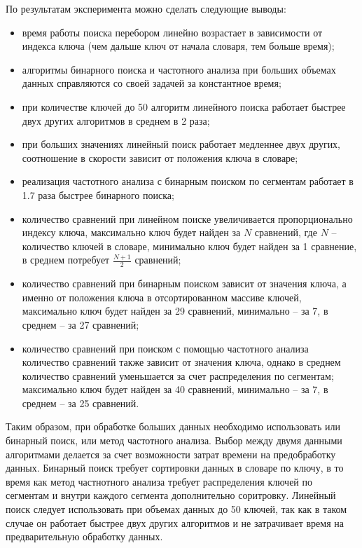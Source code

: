 По результатам эксперимента можно сделать следующие выводы:
\begin{itemize}[]
    \item время работы поиска перебором линейно возрастает в зависимости от
        индекса ключа (чем дальше ключ от начала словаря, тем больше время);
    \item алгоритмы бинарного поиска и частотного анализа при больших объемах
        данных справляются со своей задачей за константное время;
    \item при количестве ключей до 50 алгоритм линейного поиска работает
        быстрее двух других алгоритмов в среднем в 2 раза;
    \item при больших значениях линейный поиск работает медленнее двух других,
        соотношение в скорости зависит от положения ключа в словаре;
   \item реализация частотного анализа с бинарным поиском по сегментам работает
       в 1.7 раза быстрее бинарного поиска;
   \item количество сравнений при линейном поиске увеличивается пропорционально
        индексу ключа, максимально ключ будет найден за $N$ сравнений, где $N$
        -- количество ключей в словаре, минимально ключ будет найден за 1
        сравнение, в среднем потребует $\frac{N + 1}{2}$ сравнений;
   \item количество сравнений при бинарным поиском зависит от значения ключа, а
        именно от положения ключа в отсортированном массиве ключей, максимально
        ключ будет найден за 29 сравнений, минимально -- за 7, в среднем -- за
        27 сравнений;
   \item количество сравнений при поиском с помощью частотного анализа
       количество сравнений также зависит от значения ключа, однако в среднем
        количество сравнений уменьшается за счет распределения по сегментам;
        максимально ключ будет найден за 40 сравнений, минимально -- за 7, в
        среднем -- за 25 сравнений.
\end{itemize}

Таким образом, при обработке больших данных необходимо использовать или
бинарный поиск, или метод частотного анализа. Выбор между двумя данными
алгоритмами делается за счет возможности затрат времени на предобработку
данных. Бинарный поиск требует сортировки данных в словаре по ключу, в то время
как метод частнотного анализа требует распределения ключей по сегментам и
внутри каждого сегмента дополнительно соритровку. Линейный поиск следует
использовать при объемах данных до 50 ключей, так как в таком случае он
работает быстрее двух других алгоритмов и не затрачивает время на
предварительную обработку данных.
